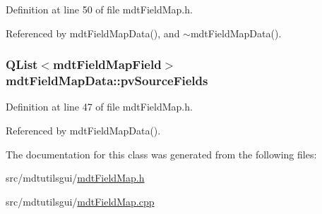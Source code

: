 Definition at line 50 of file mdt\-Field\-Map.\-h.



Referenced by mdt\-Field\-Map\-Data(), and $\sim$mdt\-Field\-Map\-Data().

\hypertarget{classmdt_field_map_data_a25c4219c0e1a5e644fb14a20b7eac635}{
\subsubsection[{pv\-Source\-Fields}]{\setlength{\rightskip}{0pt plus 5cm}Q\-List$<${\bf mdt\-Field\-Map\-Field}$>$ mdt\-Field\-Map\-Data\-::pv\-Source\-Fields}}\label{classmdt_field_map_data_a25c4219c0e1a5e644fb14a20b7eac635}


Definition at line 47 of file mdt\-Field\-Map.\-h.



Referenced by mdt\-Field\-Map\-Data().



The documentation for this class was generated from the following files\-:\begin{DoxyCompactItemize}
\item 
src/mdtutilsgui/\hyperlink{mdt_field_map_8h}{mdt\-Field\-Map.\-h}\item 
src/mdtutilsgui/\hyperlink{mdt_field_map_8cpp}{mdt\-Field\-Map.\-cpp}\end{DoxyCompactItemize}
